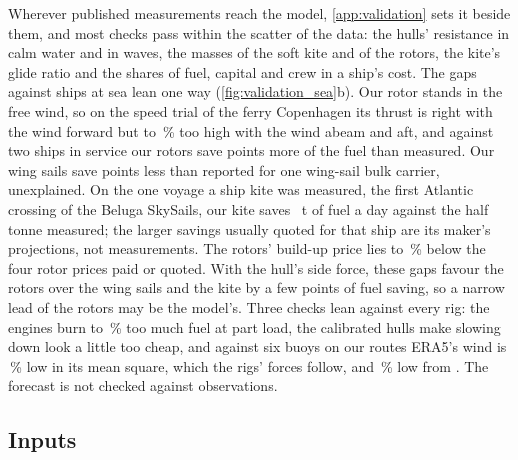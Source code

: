Wherever published measurements reach the model, \cref{app:validation} sets it beside them, and most checks pass within the scatter of the data: the hulls' resistance in calm water and in waves, the masses of the soft kite and of the rotors, the kite's glide ratio and the shares of fuel, capital and crew in a ship's cost. The gaps against ships at sea lean one way (\cref{fig:validation_sea}b). Our rotor stands in the free wind, so on the speed trial of the ferry Copenhagen its thrust is right with the wind forward but \NumCopenhagenThrustBeam{} to \NumCopenhagenThrustAft\,\% too high with the wind abeam and aft, and against two ships in service our rotors save \NumMeasuredRotorGap{} points more of the fuel than measured. Our wing sails save \NumMeasuredPyxisGap{} points less than reported for one wing-sail bulk carrier, unexplained. On the one voyage a ship kite was measured, the first Atlantic crossing of the Beluga SkySails, our kite saves \NumBelugaTonnes~t of fuel a day against the half tonne measured; the larger savings usually quoted for that ship are its maker's projections, not measurements. The rotors' build-up price lies  to \,\% below the four rotor prices paid or quoted. With the hull's side force, these gaps favour the rotors over the wing sails and the kite by a few points of fuel saving, so a narrow lead of the rotors may be the model's. Three checks lean against every rig: the engines burn  to \,\% too much fuel at part load, the calibrated hulls make slowing down look a little too cheap, and against six buoys on our routes ERA5's wind is \NumEraWindSquare\,\% low in its mean square, which the rigs' forces follow, and \NumEraStrongWind\,\% low from . The forecast is not checked against observations.

\subsection{Inputs}
\label{sec:res_inputs}

